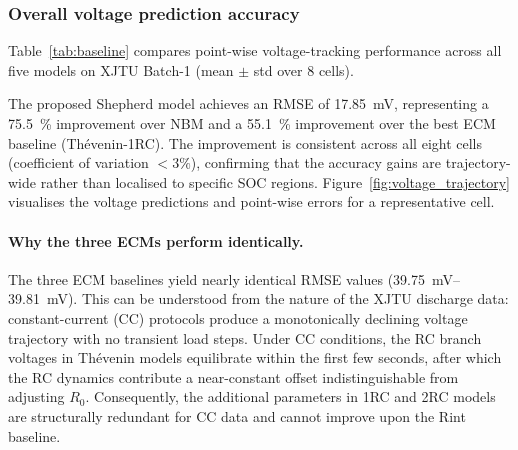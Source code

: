 \documentclass[5p,times,number]{elsarticle}
\newcommand{\figref}[1]{\textcolor{supercolor}{Figure~\ref{#1}}}
\newcommand{\tabref}[1]{\textcolor{supercolor}{Table~\ref{#1}}}
\begin{document}
\subsubsection{Overall voltage prediction accuracy}\label{sec:voltage}
\tabref{tab:baseline} compares point-wise voltage-tracking performance across all five models on XJTU Batch-1 (mean $\pm$ std over 8 cells).
\begin{table}[!tb]
\caption{Voltage prediction accuracy on XJTU Batch-1 (mean $\pm$ std, 8 cells).}\label{tab:baseline}
\centering
{}
\end{table}
The proposed Shepherd model achieves an RMSE of \SI{17.85}{\milli\volt}, representing a \SI{75.5}{\percent} improvement over NBM and a \SI{55.1}{\percent} improvement over the best ECM baseline (Th\'{e}venin-1RC).
The improvement is consistent across all eight cells (coefficient of variation $< 3\%$), confirming that the accuracy gains are trajectory-wide rather than localised to specific SOC regions.
\figref{fig:voltage_trajectory} visualises the voltage predictions and point-wise errors for a representative cell.


\paragraph{Why the three ECMs perform identically.}
The three ECM baselines yield nearly identical RMSE values (\SIrange{39.75}{39.81}{\milli\volt}).
This can be understood from the nature of the XJTU discharge data: constant-current (CC) protocols produce a monotonically declining voltage trajectory with no transient load steps.
Under CC conditions, the RC branch voltages in Th\'{e}venin models equilibrate within the first few seconds, after which the RC dynamics contribute a near-constant offset indistinguishable from adjusting $R_0$.
Consequently, the additional parameters in 1RC and 2RC models are structurally redundant for CC data and cannot improve upon the Rint baseline.
\end{document}

